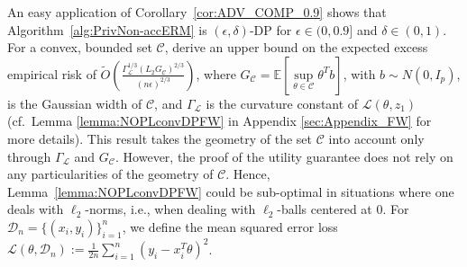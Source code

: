 \documentclass{article}
\begin{document}
An easy application of Corollary~\ref{cor:ADV_COMP_0.9} shows that Algorithm~\ref{alg:PrivNon-accERM} is $(\epsilon, \delta)$-DP for $\epsilon \in (0, 0.9]$ and $\delta \in (0, 1)$. For a convex, bounded set $\mathcal{C}$, \cite{NOPL} derive an upper bound on the expected excess empirical risk of $\widetilde{O}\left(\frac{\Gamma_{\mathcal{L}}^{1/3}(L_2G_{\mathcal{C}})^{2/3}}{(n\epsilon)^{2/3}}\right)$, where $G_{\mathcal{C}} = \mathbb{E}\left[\mathop{\sup}\limits_{\theta \in \mathcal{C}}\theta^T b\right]$, with $b \sim N(0, I_p)$, is the Gaussian width of $\mathcal{C}$, and $\Gamma_{\mathcal{L}}$ is the curvature constant of $\mathcal{L}(\theta, z_1)$ (cf.\ Lemma \ref{lemma:NOPLconvDPFW} in Appendix \ref{sec:Appendix_FW} for more details).
This result takes the geometry of the set $\mathcal{C}$ into account only through $\Gamma_\mathcal{L}$ and $G_{\mathcal{C}}$. However, the proof of the utility guarantee does not rely on any particularities of the geometry of $\mathcal{C}$. Hence, Lemma~\ref{lemma:NOPLconvDPFW} could be sub-optimal in situations where one deals with $\ell_2$-norms, i.e., when dealing with $\ell_2$-balls centered at $0$.
For $\mathcal{D}_n = \{(x_i, y_i)\}_{i = 1}^n$, we define the mean squared error loss $\mathcal{L}(\theta, \mathcal{D}_n) := \frac{1}{2n} \sum_{i=1}^n (y_i - x_i^T \theta)^2$. 
\end{document}
